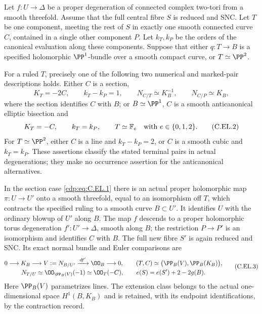 
\begin{proposition}\label{cdp:st:C.2.UN.64}
Let $f:U\to\Delta$ be a proper degeneration of connected complex
two-tori from a smooth threefold. Assume that the full central fibre
$S$ is reduced and SNC. Let $T$ be one component, meeting the rest
of $S$ in exactly one smooth connected curve $C$, contained in a
single other component $P$. Let $k_T,k_P$ be the orders of the
canonical evaluation along these components. Suppose that either
$q:T\to B$ is a specified holomorphic $\PP^1$-bundle over a smooth
compact curve, or $T\simeq\PP^2$.

For a ruled $T$, precisely one of the following two numerical and
marked-pair descriptions holds. Either $C$ is a section,
\[
 K_T=-2C,\qquad k_T-k_P=1,\qquad
 N_{C/T}\simeq K_B^{-1},\qquad N_{C/P}\simeq K_B,
                                                        \tag{C.EL.1}\label{cdp:eq:C.EL.1}
\]
where the section identifies $C$ with $B$; or $B\simeq\PP^1$,
$C$ is a smooth anticanonical elliptic bisection and
\[
 K_T=-C,\qquad k_T=k_P,\qquad
 T\simeq\mathbb F_e\quad\hbox{with }e\in\{0,1,2\}.
                                                        \tag{C.EL.2}\label{cdp:eq:C.EL.2}
\]
For $T\simeq\PP^2$, either $C$ is a line and $k_T-k_P=2$,
or $C$ is a smooth cubic and $k_T=k_P$.
These assertions classify the stated terminal pairs in actual
degenerations; they make no occurrence assertion for the
anticanonical alternatives.

In the section case \eqref{cdp:eq:C.EL.1} there is an actual proper holomorphic
map $\pi:U\to U'$ onto a smooth threefold, equal to an isomorphism
off $T$, which contracts the specified ruling to a smooth curve
$B\subset U'$. It identifies $U$ with the ordinary blowup of $U'$
along $B$. The map $f$ descends to a proper holomorphic torus
degeneration $f':U'\to\Delta$, smooth along $B$; the restriction
$P\to P'$ is an isomorphism and identifies $C$ with $B$.
The full new fibre $S'$ is again reduced and SNC. Its exact normal
bundle and Euler comparisons are
\[
\begin{gathered}
 0\longrightarrow K_B\longrightarrow V:=N_{B/U'}
        \xrightarrow{\,df'\,}\OO_B\longrightarrow0,\qquad
 (T,C)\simeq\bigl(\PP_B(V),\PP_B(K_B)\bigr),\\
 N_{T/U}\simeq\OO_{\PP_B(V)}(-1)\simeq\OO_T(-C),\qquad
 e(S)=e(S')+2-2g(B).
\end{gathered}                                                   \tag{C.EL.3}\label{cdp:eq:C.EL.3}
\]
Here $\PP_B(V)$ parametrizes lines. The extension class belongs
to the actual one-dimensional space $H^1(B,K_B)$ and is retained,
with its endpoint identifications, by the contraction record.


\end{proposition}
